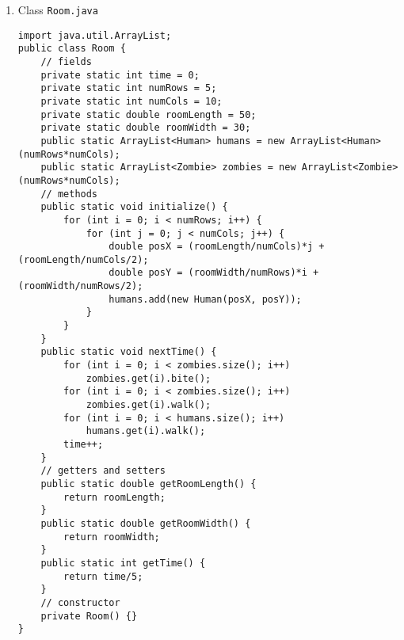 \begin{enumerate}
\lstset{language=java,tabsize=2}
\begin{lstlisting}
public class Zombie extends Person {
	// attribute
	private double speed = 1;
	private double range = 1;
	// constructors
	public Zombie(double posX, double posY) {
		super(posX, posY);
	}
	// methods
	@Override
	public void walk() {
		if (Room.humans.size() > 0) {
			double closestDistX = 0;
			double closestDistY = 0;
			double minDistance = 2*Room.getRoomLength();
			for (int i = 0; i < Room.humans.size(); i++) {
				double distX = this.getPosX() - Room.humans.get(i).getPosX();
				double distY = this.getPosY() - Room.humans.get(i).getPosY();
				double distance = Math.sqrt(Math.pow(distX, 2) + Math.pow(distY, 2));
				if (distance < minDistance) {
					minDistance = distance;
					closestDistX = distX;
					closestDistY = distY;
				}
			}
			double direction = Math.atan2(closestDistY, closestDistX);
			double newPosX = this.getPosX() + Math.cos(direction) * speed;
			double newPosY = this.getPosY() + Math.sin(direction) * speed;
			walkTo(newPosX, newPosY);
		}
	}
	public void bite() {
		for (int i = 0; i < Room.humans.size(); i++) {
			double distX = this.getPosX() - Room.humans.get(i).getPosX();
			double distY = this.getPosY() - Room.humans.get(i).getPosY();
			double distance = Math.sqrt(Math.pow(distX, 2) + Math.pow(distY, 2));
			if (distance < range) {
				Room.humans.get(i).turn();
			}
		}
	}
}
\end{lstlisting}

\item Class \texttt{Room.java}

\lstset{language=java,tabsize=2}
\begin{lstlisting}
import java.util.ArrayList;
public class Room {
	// fields
	private static int time = 0;
	private static int numRows = 5;
	private static int numCols = 10;
	private static double roomLength = 50;
	private static double roomWidth = 30;
	public static ArrayList<Human> humans = new ArrayList<Human>(numRows*numCols);
	public static ArrayList<Zombie> zombies = new ArrayList<Zombie>(numRows*numCols);
	// methods
	public static void initialize() {
		for (int i = 0; i < numRows; i++) {
			for (int j = 0; j < numCols; j++) {
				double posX = (roomLength/numCols)*j + (roomLength/numCols/2);
				double posY = (roomWidth/numRows)*i + (roomWidth/numRows/2);
				humans.add(new Human(posX, posY));
			}
		}
	}
	public static void nextTime() {
		for (int i = 0; i < zombies.size(); i++)
			zombies.get(i).bite();
		for (int i = 0; i < zombies.size(); i++)
			zombies.get(i).walk();
		for (int i = 0; i < humans.size(); i++)
			humans.get(i).walk();
		time++;
	}
	// getters and setters
	public static double getRoomLength() {
		return roomLength;
	}
	public static double getRoomWidth() {
		return roomWidth;
	}
	public static int getTime() {
		return time/5;
	}
	// constructor
	private Room() {}
}
\end{lstlisting}


\end{enumerate}
